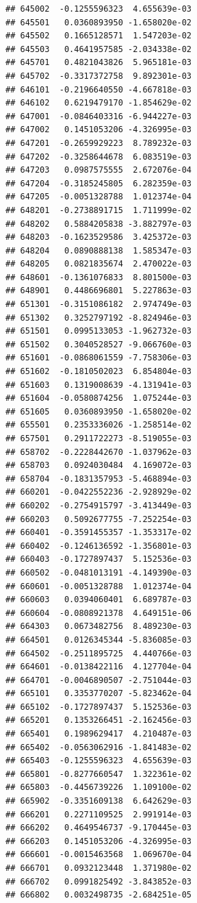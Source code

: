 \begin{frame}[fragile]
\begin{verbatim}
## 645002  -0.1255596323  4.655639e-03
## 645501   0.0360893950 -1.658020e-02
## 645502   0.1665128571  1.547203e-02
## 645503   0.4641957585 -2.034338e-02
## 645701   0.4821043826  5.965181e-03
## 645702  -0.3317372758  9.892301e-03
## 646101  -0.2196640550 -4.667818e-03
## 646102   0.6219479170 -1.854629e-02
## 647001  -0.0846403316 -6.944227e-03
## 647002   0.1451053206 -4.326995e-03
## 647201  -0.2659929223  8.789232e-03
## 647202  -0.3258644678  6.083519e-03
## 647203   0.0987575555  2.672076e-04
## 647204  -0.3185245805  6.282359e-03
## 647205  -0.0051328788  1.012374e-04
## 648201  -0.2738891715  1.711999e-02
## 648202   0.5884205838 -3.882797e-03
## 648203  -0.1623529586  3.425372e-03
## 648204   0.0890888138  1.585347e-03
## 648205   0.0821835674  2.470022e-03
## 648601  -0.1361076833  8.801500e-03
## 648901   0.4486696801  5.227863e-03
## 651301  -0.3151086182  2.974749e-03
## 651302   0.3252797192 -8.824946e-03
## 651501   0.0995133053 -1.962732e-03
## 651502   0.3040528527 -9.066760e-03
## 651601  -0.0868061559 -7.758306e-03
## 651602  -0.1810502023  6.854804e-03
## 651603   0.1319008639 -4.131941e-03
## 651604  -0.0580874256  1.075244e-03
## 651605   0.0360893950 -1.658020e-02
## 655501   0.2353336026 -1.258514e-02
## 657501   0.2911722273 -8.519055e-03
## 658702  -0.2228442670 -1.037962e-03
## 658703   0.0924030484  4.169072e-03
## 658704  -0.1831357953 -5.468894e-03
## 660201  -0.0422552236 -2.928929e-02
## 660202  -0.2754915797 -3.413449e-03
## 660203   0.5092677755 -7.252254e-03
## 660401  -0.3591455357 -1.353317e-02
## 660402  -0.1246136592 -1.356801e-03
## 660403  -0.1727897437  5.152536e-03
## 660502  -0.0481013191 -4.149390e-03
## 660601  -0.0051328788  1.012374e-04
## 660603   0.0394060401  6.689787e-03
## 660604  -0.0808921378  4.649151e-06
## 664303   0.0673482756  8.489230e-03
## 664501   0.0126345344 -5.836085e-03
## 664502  -0.2511895725  4.440766e-03
## 664601  -0.0138422116  4.127704e-04
## 664701  -0.0046890507 -2.751044e-03
## 665101   0.3353770207 -5.823462e-04
## 665102  -0.1727897437  5.152536e-03
## 665201   0.1353266451 -2.162456e-03
## 665401   0.1989629417  4.210487e-03
## 665402  -0.0563062916 -1.841483e-02
## 665403  -0.1255596323  4.655639e-03
## 665801  -0.8277660547  1.322361e-02
## 665803  -0.4456739226  1.109100e-02
## 665902  -0.3351609138  6.642629e-03
## 666201   0.2271109525  2.991914e-03
## 666202   0.4649546737 -9.170445e-03
## 666203   0.1451053206 -4.326995e-03
## 666601  -0.0015463568  1.069670e-04
## 666701   0.0932123448  1.371980e-02
## 666702   0.0991825492 -3.843852e-03
## 666802   0.0032498735 -2.684251e-05

\end{verbatim}
\end{frame}
